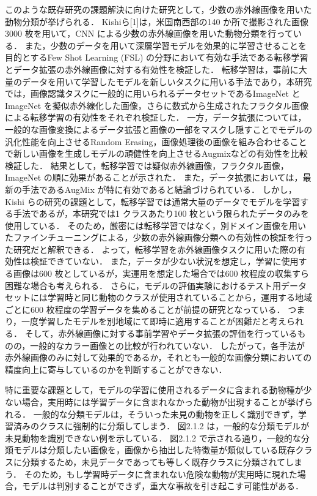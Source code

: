\documentclass[a4paper,11pt,nomag]{jsreport}
\begin{document}
このような既存研究の課題解決に向けた研究として，少数の赤外線画像を用いた動物分類が挙げられる．
Kishiら[1]は，米国南西部の140 か所で撮影された画像3000 枚を用いて，CNN による少数の赤外線画像を用いた動物分類を行っている．
また，少数のデータを用いて深層学習モデルを効果的に学習させることを目的とするFew Shot Learning (FSL) の分野において有効な手法である転移学習とデータ拡張の赤外線画像に対する有効性を検証した．
転移学習は，事前に大量のデータを用いて学習したモデルを新しいタスクに用いる手法であり，本研究では，画像認識タスクに一般的に用いられるデータセットであるImageNet とImageNet を擬似赤外線化した画像，さらに数式から生成されたフラクタル画像による転移学習の有効性をそれぞれ検証した．
一方，データ拡張については，一般的な画像変換によるデータ拡張と画像の一部をマスクし隠すことでモデルの汎化性能を向上させるRandom Erasing，画像処理後の画像を組み合わせることで新しい画像を生成しモデルの頑健性を向上させるAugmixなどの有効性を比較検証した．
結果として，転移学習では疑似赤外線画像，フラクタル画像，ImageNet の順に効果があることが示された．
また，データ拡張においては，最新の手法であるAugMix が特に有効であると結論づけられている．
しかし，Kishi らの研究の課題として，転移学習では通常大量のデータでモデルを学習する手法であるが，本研究では1 クラスあたり100 枚という限られたデータのみを使用している．
そのため，厳密には転移学習ではなく，別ドメイン画像を用いたファインチューニングによる，少数の赤外線画像分類への有効性の検証を行った研究だと解釈できる．
よって，転移学習を赤外線画像タスクに用いた際の有効性は検証できていない．
また，データが少ない状況を想定し，学習に使用する画像は600 枚としているが，実運用を想定した場合では600 枚程度の収集すら困難な場合も考えられる．
さらに，モデルの評価実験におけるテスト用データセットには学習時と同じ動物のクラスが使用されていることから，運用する地域ごとに600 枚程度の学習データを集めることが前提の研究となっている．
つまり，一度学習したモデルを別地域にて即時に適用することが困難だと考えられる．
そして，赤外線画像に対する事前学習やデータ拡張の評価を行っているものの，一般的なカラー画像との比較が行われていない．
したがって，各手法が赤外線画像のみに対して効果的であるか，それとも一般的な画像分類においての精度向上に寄与しているのかを判断することができない．

特に重要な課題として，モデルの学習に使用されるデータに含まれる動物種が少ない場合，実用時には学習データに含まれなかった動物が出現することが挙げられる．
一般的な分類モデルは，そういった未見の動物を正しく識別できず，学習済みのクラスに強制的に分類してしまう．
図2.1.2 は，一般的な分類モデルが未見動物を識別できない例を示している．
図2.1.2 で示される通り，一般的な分類モデルは分類したい画像を，画像から抽出した特徴量が類似している既存クラスに分類するため，未見データであっても等しく既存クラスに分類されてしまう．
そのため，もし学習時データに含まれない危険な動物が実用時に現れた場合，モデルは判別することができず，重大な事故を引き起こす可能性がある．
\end{document}
